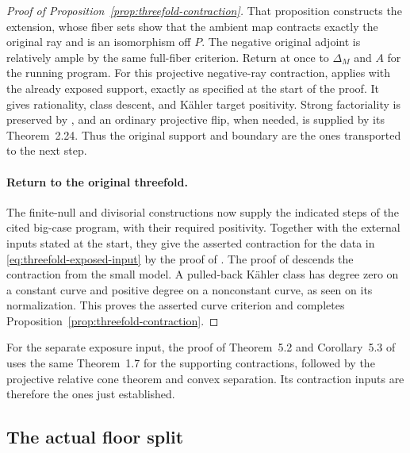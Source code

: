 \begin{proof}[Proof of Proposition~\ref{prop:threefold-contraction}]
That proposition constructs the extension, whose fiber sets show that the ambient map
contracts exactly the original ray and is an isomorphism off \(P\).
The negative original adjoint is relatively ample by the same full-fiber
criterion.  Return at once to \(\Delta_M\) and \(A\) for the running
program.  For this projective negative-ray contraction,
\cite[Proposition~3.1 and proof of Corollary~3.1]{CampanaHoeringPeternell2016}
applies with the already exposed support, exactly as specified at the
start of the proof.  It gives rationality, class descent, and K\"ahler
target positivity.  Strong factoriality is preserved by
\cite[Lemma~2.5]{DasHacon2024}, and an
ordinary projective flip, when needed, is supplied by its Theorem~2.24.
Thus the original support and boundary are the ones transported to the
next step.

\paragraph{Return to the original threefold.}
The finite-null and divisorial constructions now supply the indicated
steps of the cited big-case program, with their required positivity.
Together with the external inputs stated at the start, they give the
asserted contraction for the data in
\eqref{eq:threefold-exposed-input} by the proof of
\cite[Theorem~1.7]{DasHacon2024}.  The proof of
\cite[Theorem~5.5]{DasHaconPaun2024} descends the contraction from the
small model.  A pulled-back K\"ahler class has degree zero on a constant
curve and positive degree on a nonconstant curve, as seen on its
normalization.  This proves the asserted curve criterion and completes
Proposition~\ref{prop:threefold-contraction}.
\end{proof}

For the separate exposure input, the proof of Theorem~5.2 and
Corollary~5.3 of \cite{DasHaconPaun2024} uses the same Theorem~1.7 for
the supporting contractions, followed by the projective relative cone
theorem and convex separation.  Its contraction inputs are therefore
the ones just established.

\subsection{The actual floor split}
\label{subsec:actual-floor-split}

